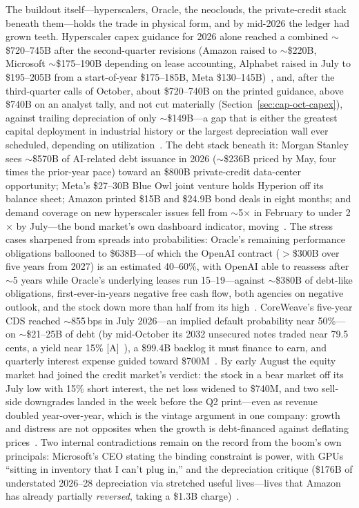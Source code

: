 The buildout itself---hyperscalers, Oracle, the neoclouds, the private-credit stack beneath them---holds the trade in physical form, and by mid-2026 the ledger had grown teeth. Hyperscaler capex guidance for 2026 alone reached a combined $\sim$\$720--745B after the second-quarter revisions (Amazon raised to $\sim$\$220B, Microsoft $\sim$\$175--190B depending on lease accounting, Alphabet raised in July to \$195--205B from a start-of-year \$175--185B, Meta \$130--145B)~\cite{premium-revenue}, and, after the third-quarter calls of October, about \$720--740B on the printed guidance, above \$740B on an analyst tally, and not cut materially (Section~\ref{sec:cap-oct-capex}), against trailing depreciation of only $\sim$\$149B---a gap that is either the greatest capital deployment in industrial history or the largest depreciation wall ever scheduled, depending on utilization~\cite{hyperscaler-capex}. The debt stack beneath it: Morgan Stanley sees $\sim$\$570B of AI-related debt issuance in 2026 ($\sim$\$236B priced by May, four times the prior-year pace) toward an \$800B private-credit data-center opportunity; Meta's \$27--30B Blue Owl joint venture holds Hyperion off its balance sheet; Amazon printed \$15B and \$24.9B bond deals in eight months; and demand coverage on new hyperscaler issues fell from $\sim$5$\times$ in February to under 2$\times$ by July---the bond market's own dashboard indicator, moving~\cite{ai-debt,meta-spv,private-credit}. The stress cases sharpened from spreads into probabilities: Oracle's remaining performance obligations ballooned to \$638B---of which the OpenAI contract ($>$\$300B over five years from 2027) is an estimated 40--60\%, with OpenAI able to reassess after $\sim$5 years while Oracle's underlying leases run 15--19---against $\sim$\$380B of debt-like obligations, first-ever-in-years negative free cash flow, both agencies on negative outlook, and the stock down more than half from its high~\cite{oracle-cds,oracle-rpo}. CoreWeave's five-year CDS reached $\sim$855\,bps in July 2026---an implied default probability near 50\%---on $\sim$\$21--25B of debt (by mid-October its 2032 unsecured notes traded near 79.5 cents, a yield near 15\% [A]~\cite{cap-coreweave-oct}), a \$99.4B backlog it must finance to earn, and quarterly interest expense guided toward \$700M~\cite{coreweave}. By early August the equity market had joined the credit market's verdict: the stock in a bear market off its July low with 15\% short interest, the net loss widened to \$740M, and two sell-side downgrades landed in the week before the Q2 print---even as revenue doubled year-over-year, which is the vintage argument in one company: growth and distress are not opposites when the growth is debt-financed against deflating prices~\cite{coreweave-q2}. Two internal contradictions remain on the record from the boom's own principals: Microsoft's CEO stating the binding constraint is power, with GPUs ``sitting in inventory that I can't plug in,'' and the depreciation critique (\$176B of understated 2026--28 depreciation via stretched useful lives---lives that Amazon has already partially \emph{reversed}, taking a \$1.3B charge)~\cite{nadella-power,burry,hyperscaler-capex}.

